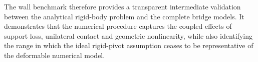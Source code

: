 The wall benchmark therefore provides a transparent intermediate validation
between the analytical rigid-body problem and the complete bridge models. It
demonstrates that the numerical procedure captures the coupled effects of
support loss, unilateral contact and geometric nonlinearity, while also
identifying the range in which the ideal rigid-pivot assumption ceases to be
representative of the deformable numerical model.
